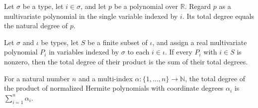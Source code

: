\begin{lemma}
\label{BooleanAnalysis.GaussianSpace.totalDegree_toMvPolynomial}
\leanok
{}
Let $\sigma$ be a type, let $i\in\sigma$, and let $p$ be a polynomial over $\mathbb R$.
Regard $p$ as a multivariate polynomial in the single variable indexed by $i$. Its total
degree equals the natural degree of $p$.
\end{lemma}

\begin{lemma}
\label{BooleanAnalysis.GaussianSpace.totalDegree_finset_prod_of_ne_zero}
\leanok
{}
Let $\sigma$ and $\iota$ be types, let $S$ be a finite subset of $\iota$, and assign a
real multivariate polynomial $P_i$ in variables indexed by $\sigma$ to each $i\in\iota$.
If every $P_i$ with $i\in S$ is nonzero, then the total degree of their product is the
sum of their total degrees.
\end{lemma}

\begin{theorem}
\label{BooleanAnalysis.GaussianSpace.multivariateHermitePolynomial_totalDegree}
\leanok
{}
For a natural number $n$ and a multi-index $\alpha\colon\{1,\ldots,n\}\to\mathbb{N}$,
the total degree of the product of normalized Hermite polynomials with coordinate
degrees $\alpha_i$ is $\sum_{i=1}^n\alpha_i$.
\end{theorem}
